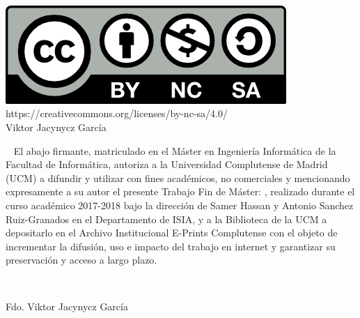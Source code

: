 {\mbox{ }

\begin{Huge}
  \begin{center}
    \tituloPortadaVal
  \end{center}
\end{Huge}

\vfill %

\begin{large}
  \begin{center}
    \textoPrimerSubtituloPortadaVal\ \leavevmode \\\relax \mbox{ } \leavevmode
    \\\relax \mbox{ } \leavevmode \\\relax
    \textoSegundoSubtituloPortadaVal \leavevmode \\[0.3em]
  \end{center}
\end{large}

\vfill %

\begin{large}
  \begin{center}
    \textbf{\institucionVal}\leavevmode \\[0.2em]
    \mbox{ } \leavevmode \\\relax \textbf{\fechaPublicacionVal}
  \end{center}
\end{large}


\newpage
\thispagestyle{empty} \mbox{ }

\vskip 15cm
\begin{center}
  \includegraphics{TeXiS/by-nc-sa.png}\\%
  https://creativecommons.org/licenses/by-nc-sa/4.0/\\%
  Viktor Jacynycz García
 \end{center}
\newpage
\thispagestyle{empty} \mbox{ } \vskip 5cm El abajo firmante, matriculado en el
Máster en Ingeniería Informática de la Facultad de Informática, autoriza a la
Universidad Complutense de Madrid (UCM) a difundir y utilizar con fines
académicos, no comerciales y mencionando expresamente a su autor el presente
Trabajo Fin de Máster: \emph{\tituloPortadaVal}, realizado durante el curso
académico 2017-2018 bajo la dirección de Samer Hassan y Antonio Sanchez
Ruiz-Granados en el Departamento de ISIA, y a la Biblioteca de la UCM a
depositarlo en el Archivo Institucional E-Prints Complutense con el objeto de
incrementar la difusión, uso e impacto del trabajo en internet y garantizar su
preservación y acceso a largo plazo.

\mbox{ } \vskip 5cm
\begin{center}
Fdo. Viktor Jacynycz García
\end{center}
}%

